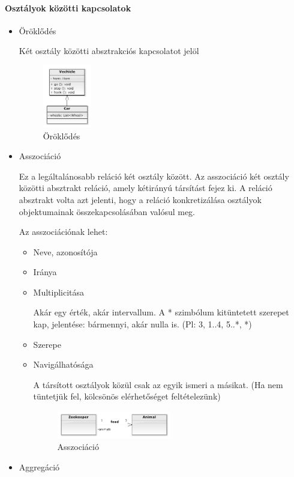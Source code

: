 \documentclass[12pt,margin=0px]{article}
\begin{document}
 			\paragraph*{Osztályok közötti kapcsolatok\\}
 					
 				\begin{itemize}
 					\item Öröklődés
	 						
	 					Két osztály közötti absztrakciós kapcsolatot jelöl
	 					\begin{figure}[H]
	 						\centering
	 						\includegraphics[width=0.2\textwidth]{img/oroklodes.png}
	 						\caption{Öröklődés}
	 					\end{figure}
	 						
 					\item Asszociáció
	 						
                        Ez a legáltalánosabb reláció két osztály között. Az asszociáció két osztály közötti absztrakt reláció, amely kétirányú társítást fejez ki. A reláció absztrakt volta azt jelenti, hogy a reláció konkretizálása osztályok objektumainak összekapcsolásában valósul meg.
	 						
	 					Az asszociációnak lehet:
	 					\begin{itemize}
	 						\item Neve, azonosítója
	 						\item Iránya
	 						\item Multiplicitása
	 							
                            Akár egy érték, akár intervallum. A * szimbólum kitüntetett szerepet kap, jelentése: bármennyi, akár nulla is. (Pl: 3, 1..4, 5..*, *)
	 						\item Szerepe
	 						\item Navigálhatósága
	 							
                            A társított osztályok közül csak az egyik ismeri a másikat. (Ha nem tüntetjük fel, kölcsönös elérhetőséget feltételezünk)
	 							
		 					\begin{figure}[H]
		 						\centering
		 						\includegraphics[width=0.5\textwidth]{img/asszociacio.png}
		 						\caption{Asszociáció}
		 					\end{figure}	
	 					\end{itemize}
\newpage
	 				\item Aggregáció
		 					

\end{itemize}
\end{document}
